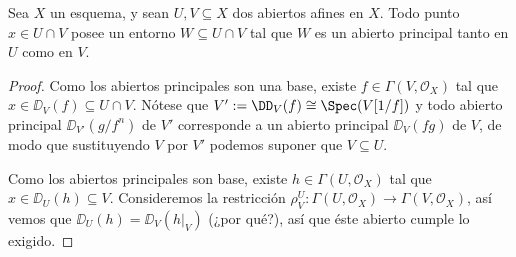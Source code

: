 \begin{prop}
	Sea $X$ un esquema, y sean $U, V \subseteq X$ dos abiertos afines en $X$.
	Todo punto $x \in U \cap V$ posee un entorno $W \subseteq U \cap V$ tal que $W$ es un abierto principal tanto en $U$ como en $V$.
\end{prop}
\begin{proof}
	Como los abiertos principales son una base, existe $f \in \Gamma(V, \mathscr{O}_X)$ tal que $x \in \DD_V(f) \subseteq U \cap V$.
	Nótese que $V' := \DD_V(f) \cong \Spec(V[1/f])$ y todo abierto principal $\DD_{V'}(g/f^n)$ de $V'$ corresponde a un abierto principal $\DD_V(fg)$
	de $V$, de modo que sustituyendo $V$ por $V'$ podemos suponer que $V \subseteq U$.

	Como los abiertos principales son base, existe $h \in \Gamma(U, \mathscr{O}_X)$ tal que $x \in \DD_U(h) \subseteq V$.
	Consideremos la restricción $\rho_V^U \colon \Gamma(U, \mathscr{O}_X) \to \Gamma(V, \mathscr{O}_X)$, así vemos que $\DD_U(h) = \DD_V(h|_V)$
	(¿por qué?), así que éste abierto cumple lo exigido.
\end{proof}



